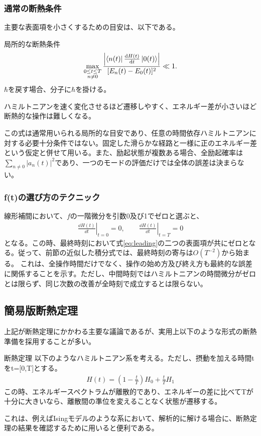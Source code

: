 \documentclass[a4paper,10.5pt]{article}
\numberwithin{equation}{section}
\begin{document}
\subsubsection{通常の断熱条件}
主要な表面項を小さくするための目安は、以下である。
\begin{resultbox}{局所的な断熱条件}
\begin{align}
\max_{\substack{0\leq t\leq T\\n\neq0}}
\frac{\left|\bra{n(t)}\frac{\dd H(t)}{\dd t}\ket{0(t)}\right|}
{[E_n(t)-E_0(t)]^2}
\ll1.
\label{eq:adiabatic-condition}
\end{align}
$\hbar$を戻す場合、分子に$\hbar$を掛ける。
\end{resultbox}
ハミルトニアンを速く変化させるほど遷移しやすく、エネルギー差が小さいほど断熱的な操作は難しくなる。
\begin{remarkbox}
この式は通常用いられる局所的な目安であり、任意の時間依存ハミルトニアンに対する必要十分条件ではない。固定した滑らかな経路と一様に正のエネルギー差という仮定と併せて用いる。また、励起状態が複数ある場合、全励起確率は$\sum_{n\neq0}|a_n(t)|^2$であり、一つのモードの評価だけでは全体の誤差は決まらない。
\end{remarkbox}

\subsubsection{f(t)の選び方のテクニック}
線形補間において、$f$の一階微分を引数0及び1でゼロと選ぶと、
\begin{align}
\left.\frac{\dd H(t)}{\dd t}\right|_{t=0}=0,\qquad
\left.\frac{\dd H(t)}{\dd t}\right|_{t=T}=0
\end{align}
となる。この時、最終時刻において式\eqref{eq:leading}の二つの表面項が共にゼロとなる。従って、前節の近似した積分式では、最終時刻の寄与は$O(T^{-2})$から始まる。
これは、全操作時間だけでなく、操作の始め方及び終え方も最終的な誤差に関係することを示す。ただし、中間時刻ではハミルトニアンの時間微分がゼロとは限らず、同じ次数の改善が全時刻で成立するとは限らない。
\subsection{簡易版断熱定理}
上記が断熱定理にかかわる主要な議論であるが、実用上以下のような形式の断熱準備を採用することが多い。
\begin{theorembox}{断熱定理}
以下のようなハミルトニアン系を考える。ただし、摂動を加える時間tをt=[0,T]とする。
\begin{equation}\begin{split}
    H(t) = (1 - \frac{t}{T}) H_{0} + \frac{t}{T}H_{1}
\end{split} \end{equation}
この時、エネルギースペクトラムが離散的であり、エネルギーの差に比べてTが十分に大きいなら、離散間の準位を変えることなく状態が遷移する。
\end{theorembox}
これは、例えばIsingモデルのような系において、解析的に解ける場合に、断熱定理の結果を確認するために用いると便利である。
\end{document}
